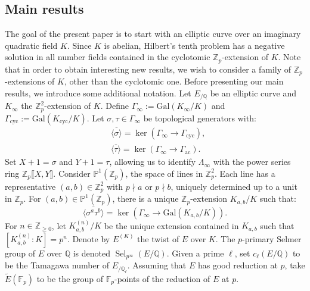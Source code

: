 \documentclass[12pt]{amsart}
\newcommand{\Z}{\mathbb{Z}}
\newcommand{\Q}{\mathbb{Q}}
\newcommand{\F}{\mathbb{F}}
\newcommand{\op}[1]{\operatorname{#1}}
\numberwithin{equation}{section}
\begin{document}
\subsection{Main results}
\par The goal of the present paper is to start with an elliptic curve over an imaginary quadratic field $K$. Since $K$ is abelian, Hilbert's tenth problem has a negative solution in all number fields contained in the cyclotomic $\Z_p$-extension of $K$. Note that in order to obtain interesting new results, we wish to consider a family of $\Z_p$-extensions of $K$, other than the cyclotomic one. 
Before presenting our main results, we introduce some additional notation. Let $ E_{/\mathbb{Q}} $ be an elliptic curve and $ K_\infty $ the $\mathbb{Z}_p^2$-extension of $ K $. Define $ \Gamma_\infty := \mathrm{Gal}(K_\infty/K) $ and $ \Gamma_{\mathrm{cyc}} := \mathrm{Gal}(K_{\mathrm{cyc}}/K) $. Let $ \sigma, \tau \in \Gamma_\infty $ be topological generators with:
\[
\begin{split}
    &\overline{\langle \sigma \rangle} = \ker\left(\Gamma_\infty \rightarrow \Gamma_{\mathrm{cyc}}\right),\\
    & \overline{\langle \tau \rangle} = \ker\left(\Gamma_\infty \rightarrow \Gamma_{\mathrm{ac}}\right).
\end{split}
\]
Set $ X+1 = \sigma $ and $ Y+1 = \tau $, allowing us to identify $ \Lambda_\infty $ with the power series ring $ \mathbb{Z}_p\llbracket X,Y\rrbracket $. Consider $ \mathbb{P}^1(\mathbb{Z}_p) $, the space of lines in $ \mathbb{Z}_p^2 $. Each line has a representative $ (a,b) \in \mathbb{Z}_p^2 $ with $ p \nmid a $ or $ p \nmid b $, uniquely determined up to a unit in $ \mathbb{Z}_p $. For $ (a,b) \in \mathbb{P}^1(\mathbb{Z}_p) $, there is a unique $\mathbb{Z}_p$-extension $ K_{a,b}/K $ such that:
\[
\overline{\langle \sigma^a \tau^b \rangle} = \ker\left(\Gamma_\infty \rightarrow \mathrm{Gal}(K_{a,b}/K)\right).
\]
For $n\in \Z_{\geq 0}$, let $K_{a,b}^{(n)}/K$ be the unique extension contained in $K_{a,b}$ such that $[K_{a,b}^{(n)}:K]=p^n$. Denote by $E^{(K)}$ the twist of $E$ over $K$. The $p$-primary Selmer group of $E$ over $\Q$ is denoted $\op{Sel}_{p^\infty}(E/\Q)$. Given a prime $\ell$, set $c_\ell(E/\Q)$ to be the Tamagawa number of $E_{/\Q_\ell}$. Assuming that $E$ has good reduction at $p$, take $\widetilde{E}(\F_p)$ to be the group of $\F_p$-points of the reduction of $E$ at $p$. 
\end{document}
